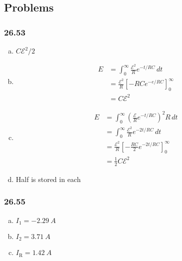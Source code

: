 \documentclass{article}
\begin{document}
\subsection{Problems}

\subsubsection{26.53}

\begin{enumerate}[(a)]
  \item $C \mathcal{E}^2 / 2$

  \item

        \begin{align*}
          E & = \int_0^\infty \frac{\mathcal{E}^2}{R} e^{-t / R C} \,dt \\
            & = \frac{\mathcal{E}^2}{R} [-R C e^{-e / R C}]_0^\infty    \\
            & = C \mathcal{E}^2
        \end{align*}

  \item

        \begin{align*}
          E & = \int_0^\infty \left( \frac{\mathcal{E}}{R} e^{-t / R C} \right)^2 R \,dt      \\
            & = \int_0^\infty \frac{\mathcal{E}^2}{R} e^{-2 t / R C} \,dt                     \\
            & = \frac{\mathcal{E}^2}{R} \left[ -\frac{R C}{2} e^{-2 t / R C} \right]_0^\infty \\
            & = \frac{1}{2} C \mathcal{E}^2
        \end{align*}

  \item Half is stored in each
\end{enumerate}

\subsubsection{26.55}

\begin{enumerate}[(a)]
  \item $I_1 = \qty{-2.29}{A}$

  \item $I_2 = \qty{3.71}{A}$

  \item $I_\textrm{R} = \qty{1.42}{A}$
\end{enumerate}
\end{document}
